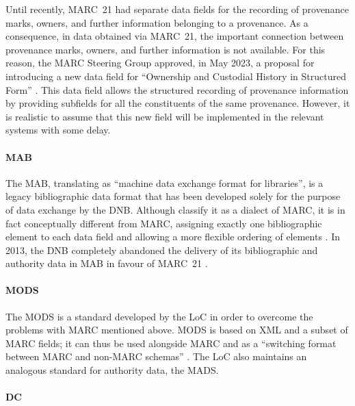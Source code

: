 Until recently, MARC~21 had separate data fields for the recording of provenance marks, owners,
and further information belonging to a provenance. As a consequence,
in data obtained via MARC~21, the important connection between provenance marks, owners,
and further information is not available.
For this reason, the MARC Steering Group approved, in May 2023, a proposal
for introducing a new data field for
\enquote{Ownership and Custodial History in Structured Form} \autocite{MARC361proposal}.
This data field allows the structured recording of provenance information
by providing subfields for all the constituents of the same provenance.
However, it is realistic to assume that this new field
will be implemented in the relevant systems with some delay.

\paragraph{MAB}

The \gls{MAB}, translating as \enquote{machine data exchange format for libraries},
is a legacy bibliographic data format that has been developed solely for the purpose of data exchange
by the \gls{DNB}.
Although \textcite[p.204]{Hider2008} classify it as a dialect of \gls{MARC},
it is in fact conceptually different from \gls{MARC},
assigning exactly one bibliographic element to each data field
and allowing a more flexible ordering of elements \autocite{WikiMAB}.
In 2013, the \gls{DNB} completely abandoned the delivery of its bibliographic and authority data in MAB
in favour of \gls{MARC}~21 \autocite{MAB}.

\paragraph{MODS}

The \gls{MODS} is a standard developed by the \gls{LoC}
in order to overcome the problems with \gls{MARC} mentioned above.
MODS is based on \gls{XML} and a subset of MARC fields;
it can thus be used alongside MARC and as a \enquote{switching format
between MARC and non-MARC schemas} \autocite[p.219]{Hider2008}.
The LoC also maintains an analogous standard for authority data,
the \gls{MADS}.

\paragraph{DC}

